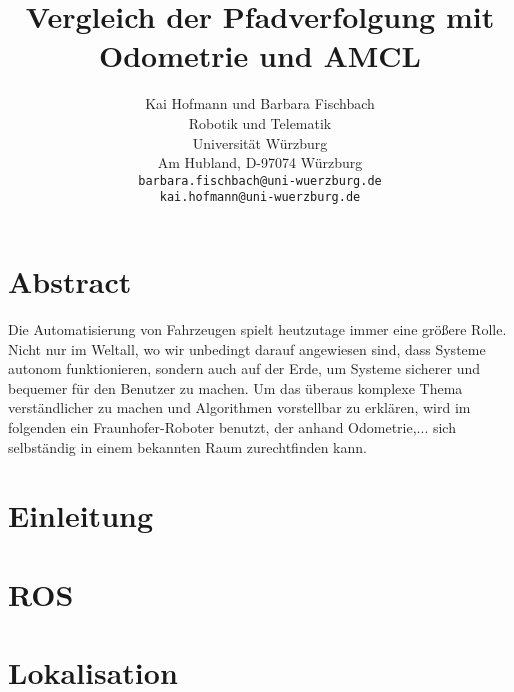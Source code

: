 \documentclass[11pt,a4paper]{article}
\begin{document}
\sloppy
	



\title{\Large\bf Vergleich der Pfadverfolgung mit Odometrie und AMCL }

\author{Kai Hofmann und Barbara Fischbach\\
  Robotik und Telematik \\
  Universit\"at W\"urzburg\\
  Am Hubland, D-97074 W\"urzburg\\
{\small \texttt{barbara.fischbach@uni-wuerzburg.de}}\\
{\small \texttt{kai.hofmann@uni-wuerzburg.de}}}

\date{}




\maketitle

\newpage

\tableofcontents{}

\newpage

\twocolumn

\section*{Abstract}
{Die Automatisierung von Fahrzeugen spielt heutzutage immer eine gr\"o\ss{}ere Rolle. Nicht nur im Weltall, wo wir unbedingt darauf angewiesen sind, dass Systeme autonom funktionieren, sondern auch auf der Erde, um Systeme sicherer und bequemer f\"ur den Benutzer zu machen. Um das überaus komplexe Thema verst\"andlicher zu machen und Algorithmen vorstellbar zu erkl\"aren, wird im folgenden ein Fraunhofer-Roboter benutzt, der anhand Odometrie,... sich selbst\"andig in einem bekannten Raum zurechtfinden kann.}


\section{Einleitung}

\section{ROS}

\section{Lokalisation}
\end{document}
